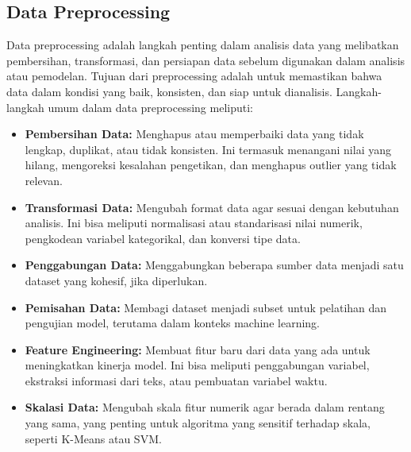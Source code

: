 \subsection{Data Preprocessing}
Data preprocessing adalah langkah penting dalam analisis data yang melibatkan pembersihan, transformasi, dan persiapan data sebelum digunakan dalam analisis atau pemodelan. Tujuan dari preprocessing adalah untuk memastikan bahwa data dalam kondisi yang baik, konsisten, dan siap untuk dianalisis. Langkah-langkah umum dalam data preprocessing meliputi:
\begin{itemize}
    \item \textbf{Pembersihan Data:} Menghapus atau memperbaiki data yang tidak lengkap, duplikat, atau tidak konsisten. Ini termasuk menangani nilai yang hilang, mengoreksi kesalahan pengetikan, dan menghapus outlier yang tidak relevan.
    \item \textbf{Transformasi Data:} Mengubah format data agar sesuai dengan kebutuhan analisis. Ini bisa meliputi normalisasi atau standarisasi nilai numerik, pengkodean variabel kategorikal, dan konversi tipe data.
    \item \textbf{Penggabungan Data:} Menggabungkan beberapa sumber data menjadi satu dataset yang kohesif, jika diperlukan.
    \item \textbf{Pemisahan Data:} Membagi dataset menjadi subset untuk pelatihan dan pengujian model, terutama dalam konteks machine learning.
    \item \textbf{Feature Engineering:} Membuat fitur baru dari data yang ada untuk meningkatkan kinerja model. Ini bisa meliputi penggabungan variabel, ekstraksi informasi dari teks, atau pembuatan variabel waktu.
    \item \textbf{Skalasi Data:} Mengubah skala fitur numerik agar berada dalam rentang yang sama, yang penting untuk algoritma yang sensitif terhadap skala, seperti K-Means atau SVM.
\end{itemize}

